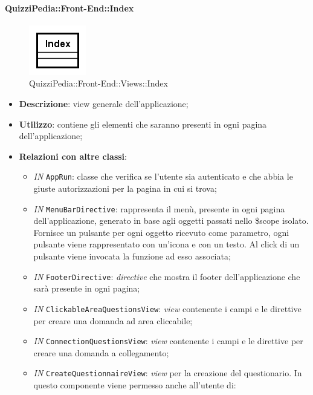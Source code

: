 	
	\paragraph{QuizziPedia::Front-End::Index}
	\begin{figure} [ht]
		\centering
		\includegraphics[scale=0.80]{UML/Classi/Front-End/QuizziPedia_Front-end_Views_Index.png}
		\caption{QuizziPedia::Front-End::Views::Index}
	\end{figure} \FloatBarrier
	\begin{itemize}
		\item \textbf{Descrizione}: view generale dell'applicazione;
		\item \textbf{Utilizzo}: contiene gli elementi che saranno presenti in ogni pagina dell'applicazione;
		\item \textbf{Relazioni con altre classi}:
		\begin{itemize}
			\item \textit{IN} \texttt{AppRun}: classe che verifica se l'utente sia autenticato e che abbia le giuste autorizzazioni per la pagina in cui si trova;
			\item \textit{IN} \texttt{MenuBarDirective}: rappresenta il menù, presente in ogni pagina dell'applicazione, generato in base agli oggetti passati nello \$scope isolato. Fornisce un pulsante per ogni oggetto ricevuto come parametro, ogni pulsante viene rappresentato con un’icona e con un testo. Al click di un pulsante viene invocata la funzione ad esso associata;
			\item \textit{IN} \texttt{FooterDirective}: \textit{directive} che mostra il footer dell'applicazione che sarà presente in ogni pagina;
			\item \textit{IN} \texttt{ClickableAreaQuestionsView}: \textit{view} contenente i campi e le direttive per creare una domanda ad area cliccabile;
			\item \textit{IN} \texttt{ConnectionQuestionsView}: \textit{view} contenente i campi e le direttive per creare una domanda a collegamento;
			\item \textit{IN} \texttt{CreateQuestionnaireView}: \textit{view} per la creazione del questionario. In questo componente viene permesso anche all'utente di:
			\begin{itemize}

\end{itemize}
\end{itemize}
\end{itemize}
